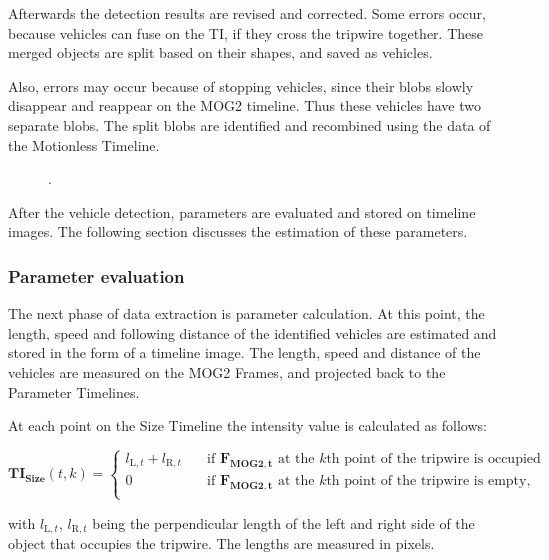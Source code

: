 Afterwards the detection results are revised and corrected.
Some errors occur, because vehicles can fuse on the TI, if they cross the tripwire together. These merged objects are split based on their shapes, and saved as vehicles.

Also, errors may occur because of stopping vehicles, since their blobs slowly disappear and reappear on the MOG2 timeline.
Thus these vehicles have two separate blobs.
The split blobs are identified and recombined using the data of the Motionless Timeline. 

\begin{figure}[!h]
	\centering
	
	\caption{.\label{fig:size_speed_following_distance}}
\end{figure}

After the vehicle detection, parameters are evaluated and stored on timeline images.
The following section discusses the estimation of these parameters.

\subsubsection{Parameter evaluation}\label{chap:parameter_evaluation}
The next phase of data extraction is parameter calculation.
At this point, the length, speed and following distance of the identified vehicles are estimated and stored in the form of a timeline image.
The length, speed and distance of the vehicles are measured on the MOG2 Frames, and projected back to the Parameter Timelines.

At each point on the Size Timeline the intensity value is calculated as follows:

\begin{displaymath}
 	\boldsymbol{TI_{\text{Size}}}(t,k) = 
	\begin{cases}
	l_{\text{L},t} + l_{\text{R},t}        & \quad \text{if } \boldsymbol{F_{\text{MOG2},t}} \text{ at the } k\text{th} \text{ point of the tripwire is occupied}\\
  	0		& \quad \text{if } \boldsymbol{F_{\text{MOG2},t}} \text{ at the } k\text{th} \text{ point of the tripwire is empty,}\\
	\end{cases}
\end{displaymath}

with $l_{\text{L},t}$, $l_{\text{R},t}$ being the perpendicular length of the left and right side of the object that occupies the tripwire.
The lengths are measured in pixels.

